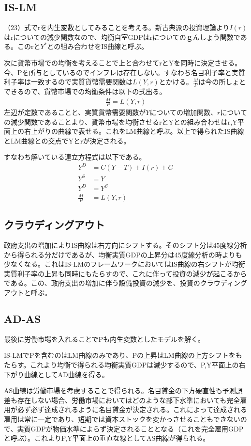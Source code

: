 \documentclass{jsarticle}
\begin{document}
\subsection{IS-LM}
（23）式でrを内生変数としてみることを考える。新古典派の投資理論より$I(r)$はrについての減少関数なので、均衡自室GDPはrについてのｇんしょう関数である。このrと$Y^*$との組み合わせをIS曲線と呼ぶ。

次に貨幣市場での均衡を考えることで上と合わせてrとYを同時に決定させる。今、Pを所与としているのでインフレは存在しない。すなわち名目利子率と実質利子率は一致するので実質貨幣需要関数は$L(Y, r)$とかける。$\frac{M}{P}$は今の所しょとできるので、貨幣市場での均衡条件は以下の式出る。
\begin{align}
	\frac{M}{P} = L(Y, r)
\end{align}
左辺が定数であることと、実質貨幣需要関数が$Y$についての増加関数、$r$についての減少関数であることより、貨幣市場を均衡させるrとYとの組み合わせはr,Y平面上の右上がりの曲線で表せる。これをLM曲線と呼ぶ。以上で得られたIS曲線とLM曲線との交点でYとrが決定される。

すなわち解いている連立方程式は以下である。
\begin{align*}
	Y^D &= C(Y - T) + I(r) + G \\
	Y^S &= Y\\
	Y^D &= Y^S\\
	\frac{M}{P} &= L(Y, r)
\end{align*}

\subsection{クラウディングアウト}
政府支出の増加によりIS曲線は右方向にシフトする。そのシフト分は45度線分析から得られる分だけであるが、均衡実質GDPの上昇分は45度線分析の時よりも少なくなる。これはIS-LMのフレームワークにおいてはIS曲線の右シフトが均衡実質利子率の上昇も同時にもたらすので、これに伴って投資の減少が起こるからである。この、政府支出の増加に伴う設備投資の減少を、投資のクラウディングアウトと呼ぶ。

\subsection{AD-AS}
最後に労働市場を入れることでPも内生変数としたモデルを解く。

IS-LMでPを含むのはLM曲線のみであり、Pの上昇はLM曲線の上方シフトをもたらす。これより均衡で得られる均衡実質GDPは減少するので、P,Y平面上の右下がり曲線としてAD曲線を得る。

AS曲線は労働市場を考慮することで得られる。名目賃金の下方硬直性も予測誤差も存在しない場合、労働市場においてはどのような部下水準においても完全雇用が必ず必ず達成されるように名目賃金が決定される。これによって達成される雇用は常に一定であり、短期では資本ストックを変かっさせることもできないので、実質GDPが物価水準によらず決定されることとなる（これを完全雇用GDPと呼ぶ）。これよりP,Y平面上の垂直な線としてAS曲線が得られる。
\end{document}
